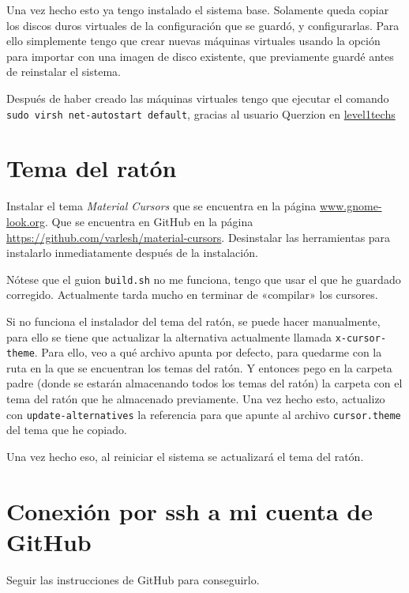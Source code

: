 \documentclass{article}
\begin{document}
    Una vez hecho esto ya tengo instalado el sistema base. Solamente queda
    copiar los discos duros virtuales de la configuración que se guardó, y
    configurarlas. Para ello simplemente tengo que crear nuevas máquinas
    virtuales usando la opción para importar con una imagen de disco existente,
    que previamente guardé antes de reinstalar el sistema.

    Después de haber creado las máquinas virtuales tengo que ejecutar el comando
    \texttt{sudo virsh net-autostart default}, gracias al usuario Querzion en
    \href{https://forum.level1techs.com/t/solved-qemu-network-default-is-not-active-booting-from-hard-disk/194698}
    {level1techs}

    \section{Tema del ratón}
    Instalar el tema \textit{Material Cursors} que se encuentra en la página
    \href{https://www.gnome-look.org}{www.gnome-look.org}. Que se encuentra en
    GitHub en la página
    \href{https://github.com/varlesh/material-cursors}
    {https://github.com/varlesh/material-cursors}. Desinstalar las herramientas
    para instalarlo inmediatamente después de la instalación.

    Nótese que el guion \texttt{build.sh} no me funciona, tengo que usar el que
    he guardado corregido. Actualmente tarda mucho en terminar de «compilar» los
    cursores.

    Si no funciona el instalador del tema del ratón, se puede hacer manualmente,
    para ello se tiene que actualizar la alternativa actualmente llamada
    \texttt{x-cursor-theme}. Para ello, veo a qué archivo apunta por defecto,
    para quedarme con la ruta en la que se encuentran los temas del ratón. Y
    entonces pego en la carpeta padre (donde se estarán almacenando todos los
    temas del ratón) la carpeta con el tema del ratón que he almacenado
    previamente. Una vez hecho esto, actualizo con \texttt{update-alternatives}
    la referencia para que apunte al archivo \texttt{cursor.theme} del tema que
    he copiado.

    Una vez hecho eso, al reiniciar el sistema se actualizará el tema del ratón.

    \section{Conexión por ssh a mi cuenta de GitHub}
    Seguir las instrucciones de GitHub para conseguirlo.
\end{document}
